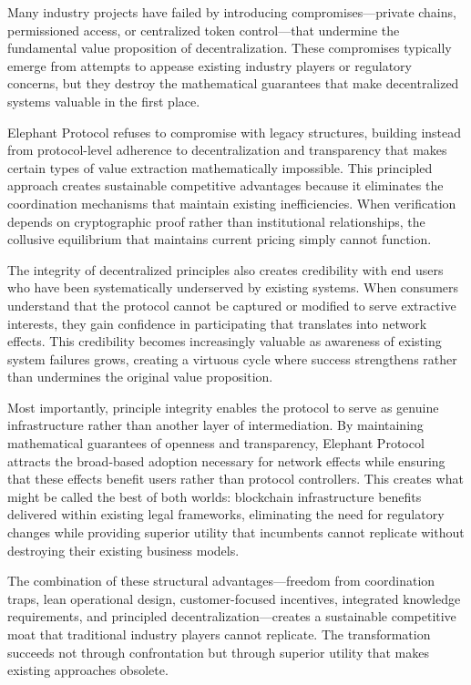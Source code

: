 Many industry projects have failed by introducing compromises---private chains, permissioned access, or centralized token control---that undermine the fundamental value proposition of decentralization. These compromises typically emerge from attempts to appease existing industry players or regulatory concerns, but they destroy the mathematical guarantees that make decentralized systems valuable in the first place.

Elephant Protocol refuses to compromise with legacy structures, building instead from protocol-level adherence to decentralization and transparency that makes certain types of value extraction mathematically impossible. This principled approach creates sustainable competitive advantages because it eliminates the coordination mechanisms that maintain existing inefficiencies. When verification depends on cryptographic proof rather than institutional relationships, the collusive equilibrium that maintains current pricing simply cannot function.

The integrity of decentralized principles also creates credibility with end users who have been systematically underserved by existing systems. When consumers understand that the protocol cannot be captured or modified to serve extractive interests, they gain confidence in participating that translates into network effects. This credibility becomes increasingly valuable as awareness of existing system failures grows, creating a virtuous cycle where success strengthens rather than undermines the original value proposition.

Most importantly, principle integrity enables the protocol to serve as genuine infrastructure rather than another layer of intermediation. By maintaining mathematical guarantees of openness and transparency, Elephant Protocol attracts the broad-based adoption necessary for network effects while ensuring that these effects benefit users rather than protocol controllers. This creates what might be called the best of both worlds: blockchain infrastructure benefits delivered within existing legal frameworks, eliminating the need for regulatory changes while providing superior utility that incumbents cannot replicate without destroying their existing business models.

The combination of these structural advantages---freedom from coordination traps, lean operational design, customer-focused incentives, integrated knowledge requirements, and principled decentralization---creates a sustainable competitive moat that traditional industry players cannot replicate. The transformation succeeds not through confrontation but through superior utility that makes existing approaches obsolete.